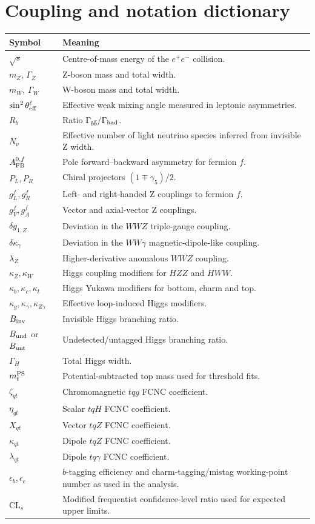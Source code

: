 \documentclass[11pt,a4paper]{report}
\newcommand{\ee}{e^+e^-}
\newcommand{\CLs}{\mathrm{CL}_s}
\begin{document}
\chapter{Coupling and notation dictionary}
\begin{longtable}{p{}p{}}
\toprule
Symbol & Meaning \\
\midrule
$\sqrt{s}$ & Centre-of-mass energy of the $\ee$ collision. \\
$m_Z$, $\Gamma_Z$ & Z-boson mass and total width. \\
$m_W$, $\Gamma_W$ & W-boson mass and total width. \\
$\sin^2\theta_{\rm eff}^\ell$ & Effective weak mixing angle measured in leptonic asymmetries. \\
$R_b$ & Ratio $\Gamma_{b\bar b}/\Gamma_{\rm had}$. \\
$N_\nu$ & Effective number of light neutrino species inferred from invisible Z width. \\
$A_{\rm FB}^{0,f}$ & Pole forward--backward asymmetry for fermion $f$. \\
$P_L,P_R$ & Chiral projectors $(1\mp\gamma_5)/2$. \\
$g_L^f,g_R^f$ & Left- and right-handed Z couplings to fermion $f$. \\
$g_V^f,g_A^f$ & Vector and axial-vector Z couplings. \\
$\delta g_{1,Z}$ & Deviation in the $WWZ$ triple-gauge coupling. \\
$\delta\kappa_\gamma$ & Deviation in the $WW\gamma$ magnetic-dipole-like coupling. \\
$\lambda_Z$ & Higher-derivative anomalous $WWZ$ coupling. \\
$\kappa_Z,\kappa_W$ & Higgs coupling modifiers for $HZZ$ and $HWW$. \\
$\kappa_b,\kappa_c,\kappa_t$ & Higgs Yukawa modifiers for bottom, charm and top. \\
$\kappa_g,\kappa_\gamma,\kappa_{Z\gamma}$ & Effective loop-induced Higgs modifiers. \\
$B_{\rm inv}$ & Invisible Higgs branching ratio. \\
$B_{\rm und}$ or $B_{\rm unt}$ & Undetected/untagged Higgs branching ratio. \\
$\Gamma_H$ & Total Higgs width. \\
$m_t^{\rm PS}$ & Potential-subtracted top mass used for threshold fits. \\
$\zeta_{qt}$ & Chromomagnetic $tqg$ FCNC coefficient. \\
$\eta_{qt}$ & Scalar $tqH$ FCNC coefficient. \\
$X_{qt}$ & Vector $tqZ$ FCNC coefficient. \\
$\kappa_{qt}$ & Dipole $tqZ$ FCNC coefficient. \\
$\lambda_{qt}$ & Dipole $tq\gamma$ FCNC coefficient. \\
$\epsilon_b,\epsilon_c$ & $b$-tagging efficiency and charm-tagging/mistag working-point number as used in the analysis. \\
$\CLs$ & Modified frequentist confidence-level ratio used for expected upper limits. \\
\bottomrule
\end{longtable}
\end{document}

